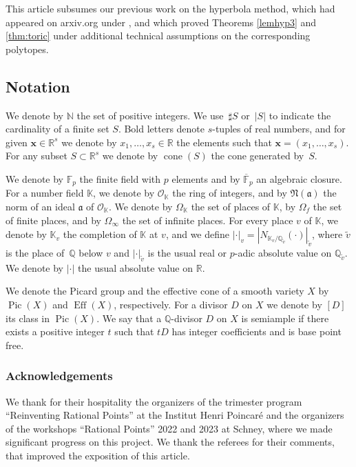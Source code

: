 \documentclass[JEP,XML,SOM,Unicode,published]{cedram}
\newcommand{\bfx}{\boldsymbol{x}}
\newcommand{\OO}{\mathcal{O}}
\newcommand\NN{\mathbb{N}}
\newcommand\RR{\mathbb{R}}
\newcommand\QQ{\mathbb{Q}}
\newcommand\FF{\mathbb{F}}
\newcommand{\KK}{\mathbb{K}}
\newcommand{\idealnorm}{\mathfrak{N}}
\DeclareMathOperator{\cone}{cone}
\DeclareMathOperator{\pic}{Pic}
\DeclareMathOperator{\eff}{Eff}
\theoremstyle{definition}
\numberwithin{theorem}{section}
\begin{document}
This article subsumes our previous work on the hyperbola method, which had appeared on arxiv.org under , and which proved Theorems \ref{lemhyp3} and \ref{thm:toric} under additional technical assumptions on the corresponding polytopes.

\subsection{Notation}
We denote by $\NN$ the set of positive integers.
We use~$\sharp S$ or~$| S |$ to indicate the cardinality of a finite set $S$.
Bold letters denote $s$-tuples of real numbers, and for given $\bfx\in\RR^s$
we denote by $x_1,\dots,x_s\in\RR$ the elements such that $\bfx=(x_1,\dots,x_s)$.
For any subset $S\subset\RR^s$ we denote by $\cone(S)$ the cone generated by~$S$.

We denote by $\FF_p$ the finite field with $p$ elements and by $\overline{\FF}_p$ an algebraic closure. For a number field $\KK$, we denote by $\OO_{\KK}$ the ring of integers,
and by $\idealnorm(\mathfrak a)$ the norm of an ideal $\mathfrak a$ of $\OO_{\KK}$.
We denote by $\Omega_{\KK}$ the set of places of $\KK$, by $\Omega_f$ the set of finite places,
and by $\Omega_\infty$ the set of infinite places.
For every place $v$ of $\KK$, we denote by $\KK_v$ the completion of $\KK$ at $v$,
and we define $|\cdot|_v=|N_{\KK_v/\QQ_{\tilde v}}(\cdot)|_{\tilde v}$,
where $\tilde v$ is the place of~$\QQ$ below $v$ and $|\cdot|_{\tilde v}$ is the usual real
or $p$-adic absolute value on $\QQ_{\tilde v}$.
We denote by $|\cdot|$ the usual absolute value on $\RR$.

We denote the Picard group and the effective cone of a smooth variety $X$
by $\pic(X)$ and $\eff(X)$, respectively.
For a divisor $D$ on $X$ we denote by $[D]$ its class in $\pic(X)$.
We say that a $\QQ$-divisor $D$ on $X$ is semiample if there exists a positive integer $t$
such that $tD$ has integer coefficients and is base point free.

\subsubsection*{Acknowledgements}
We thank for their hospitality the organizers of the trimester program
``Reinventing Rational Points'' at the Institut Henri Poincaré and the organizers of the workshops ``Rational Points'' 2022 and 2023 at Schney, where we made significant progress on this project. We thank the referees for their comments, that improved the exposition of this article.
\end{document}
